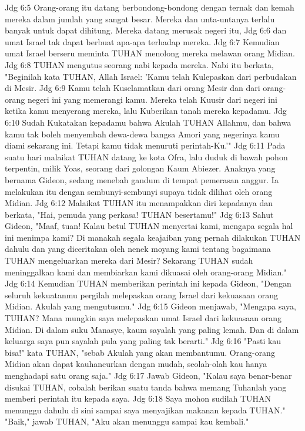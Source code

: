 Jdg 6:5  Orang-orang itu datang berbondong-bondong dengan ternak dan kemah mereka dalam jumlah yang sangat besar. Mereka dan unta-untanya terlalu banyak untuk dapat dihitung. Mereka datang merusak negeri itu,
Jdg 6:6  dan umat Israel tak dapat berbuat apa-apa terhadap mereka.
Jdg 6:7  Kemudian umat Israel berseru meminta TUHAN menolong mereka melawan orang Midian.
Jdg 6:8  TUHAN mengutus seorang nabi kepada mereka. Nabi itu berkata, "Beginilah kata TUHAN, Allah Israel: 'Kamu telah Kulepaskan dari perbudakan di Mesir.
Jdg 6:9  Kamu telah Kuselamatkan dari orang Mesir dan dari orang-orang negeri ini yang memerangi kamu. Mereka telah Kuusir dari negeri ini ketika kamu menyerang mereka, lalu Kuberikan tanah mereka kepadamu.
Jdg 6:10  Sudah Kukatakan kepadamu bahwa Akulah TUHAN Allahmu, dan bahwa kamu tak boleh menyembah dewa-dewa bangsa Amori yang negerinya kamu diami sekarang ini. Tetapi kamu tidak menuruti perintah-Ku.'"
Jdg 6:11  Pada suatu hari malaikat TUHAN datang ke kota Ofra, lalu duduk di bawah pohon terpentin, milik Yoas, seorang dari golongan Kaum Abiezer. Anaknya yang bernama Gideon, sedang menebah gandum di tempat pemerasan anggur. Ia melakukan itu dengan sembunyi-sembunyi supaya tidak dilihat oleh orang Midian.
Jdg 6:12  Malaikat TUHAN itu menampakkan diri kepadanya dan berkata, "Hai, pemuda yang perkasa! TUHAN besertamu!"
Jdg 6:13  Sahut Gideon, "Maaf, tuan! Kalau betul TUHAN menyertai kami, mengapa segala hal ini menimpa kami? Di manakah segala keajaiban yang pernah dilakukan TUHAN dahulu dan yang diceritakan oleh nenek moyang kami tentang bagaimana TUHAN mengeluarkan mereka dari Mesir? Sekarang TUHAN sudah meninggalkan kami dan membiarkan kami dikuasai oleh orang-orang Midian."
Jdg 6:14  Kemudian TUHAN memberikan perintah ini kepada Gideon, "Dengan seluruh kekuatanmu pergilah melepaskan orang Israel dari kekuasaan orang Midian. Akulah yang mengutusmu."
Jdg 6:15  Gideon menjawab, "Mengapa saya, TUHAN? Mana mungkin saya melepaskan umat Israel dari kekuasaan orang Midian. Di dalam suku Manasye, kaum sayalah yang paling lemah. Dan di dalam keluarga saya pun sayalah pula yang paling tak berarti."
Jdg 6:16  "Pasti kau bisa!" kata TUHAN, "sebab Akulah yang akan membantumu. Orang-orang Midian akan dapat kauhancurkan dengan mudah, seolah-olah kau hanya menghadapi satu orang saja."
Jdg 6:17  Jawab Gideon, "Kalau saya benar-benar disukai TUHAN, cobalah berikan suatu tanda bahwa memang Tuhanlah yang memberi perintah itu kepada saya.
Jdg 6:18  Saya mohon sudilah TUHAN menunggu dahulu di sini sampai saya menyajikan makanan kepada TUHAN." "Baik," jawab TUHAN, "Aku akan menunggu sampai kau kembali."
